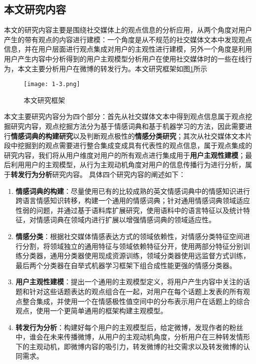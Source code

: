 \subsection{本文研究内容}
本文的研究内容主要是围绕社交媒体上的观点信息的分析应用，从两个角度对用户产生的带有观点的内容进行建模：一个角度是从不规范的社交媒体文本中发现观点信息，并在用户层面进行观点集成对用户的主观性进行建模，另外一个角度是利用用户产生内容中分析得到的用户主观模型分析用户在使用社交媒体时的一些在线行为，本文主要分析用户在微博的转发行为。本文研究框架如图\ref{fig1-3}所示


\begin{figure}[htp]
\centering
\texttt{[image: 1-3.png]}
\caption{本文研究框架}
\label{fig1-3}
\end{figure}

本文主要研究内容分为四个部分：首先从社交媒体文本中得到观点信息属于观点挖掘研究内容，观点挖掘方法分为基于情感词典和基于机器学习的方法，因此需要进行\textbf{情感词典的构建研究}以及判断观点极性的\textbf{情感分类研究}；其次从社交媒体文本片段中挖掘到的观点需要进行整合集成变成具有代表性的观点信息，属于观点集成的研究内容，我们将从用户维度对用户的所有观点进行集成用于\textbf{用户主观性建模}；最后利用用户的主观模型，从行为主观动机角度对用户的信息传播行为进行分析，属于\textbf{转发行为分析}研究内容。
具体四个研究内容的阐述如下：

\begin{enumerate}
\item \textbf{情感词典的构建}：尽量使用已有的比较成熟的英文情感词典中的情感知识进行跨语言情感知识转移，构建一个通用的情感词典；针对通用情感词典领域适应性弱的问题，并通过基于语料库扩展研究，使用语料中的语言特征以及统计特征，对情感词典在领域内进行扩展以增强情感词典的领域适应性。
\item \textbf{情感分类}：根据社交媒体情感表达方式的领域依赖性，对情感分类特征空间进行分割，将领域独立的通用特征与领域依赖特征分开，使用两部分特征分别训练分类器，通用分类器使用现成资源训练，领域分类器使用远监督方式训练，最后两个分类器在自举式机器学习框架下组合成性能更强的情感分类器。
\item \textbf{用户主观性建模}：提出一个通用的主观模型定义，将用户产生内容中关注的话题和针对这些话题表达的观点组合在一起，对用户在每个话题上发表的所有观点整合集成，并使用一个在情感极性值空间中的分布表示用户在话题上的综合观点，使用一个更简单通用的框架构建主观模型。
\item \textbf{转发行为分析}：构建好每个用户的主观模型后，给定微博，发现作者的粉丝中，谁会在未来传播微博，从用户的主观动机角度，分析用户在三种转发情形下的主观动机，即微博内容的吸引力，转发微博的社交需求以及转发微博的认同需求。
\end{enumerate}

